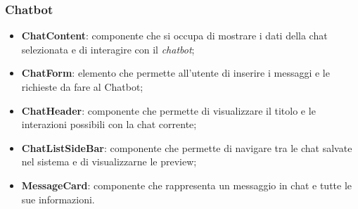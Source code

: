 \documentclass[10pt, a4paper]{article}
\begin{document}
\subsubsection{Chatbot}
\begin{itemize} 
    \item \label{ChatContent}\textbf{ChatContent}: componente che si occupa di mostrare i dati della chat selezionata e di interagire con il \textit{chatbot\pg};
    \item \label{ChatForm}\textbf{ChatForm}: elemento che permette all'utente di inserire i messaggi e le richieste da fare al Chatbot;
    \item \label{ChatHeader}\textbf{ChatHeader}: componente che permette di visualizzare il titolo e le interazioni possibili con la chat corrente; 
    \item \label{ChatListSideBar}\textbf{ChatListSideBar}: componente che permette di navigare tra le chat salvate nel sistema e di visualizzarne le preview;
    \item \label{MessageCard}\textbf{MessageCard}: componente che rappresenta un messaggio in chat e tutte le sue informazioni.  
\end{itemize}
\end{document}
